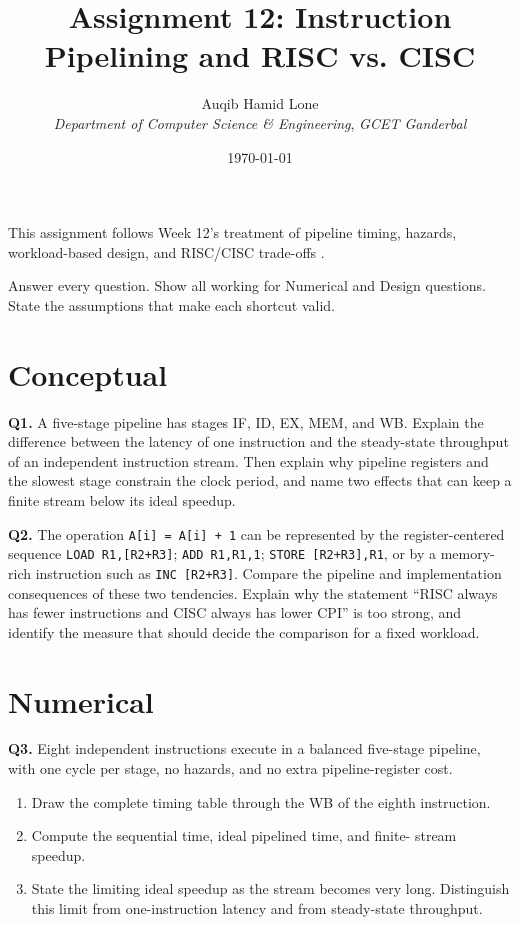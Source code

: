 \documentclass[11pt]{article}
\title{Assignment 12: Instruction Pipelining and RISC vs. CISC}
\author{Auqib Hamid Lone\\[0.3em]
  \emph{Department of Computer Science \& Engineering}, \emph{GCET Ganderbal}}
\date{\today}
\begin{document}
\maketitle

\noindent This assignment follows Week 12's treatment of pipeline timing,
hazards, workload-based design, and RISC/CISC trade-offs
\cite{Stallings2015_computer_organization,PattersonHennessy2017_computer_organization_design}.

\noindent Answer every question. Show all working for Numerical and Design
questions. State the assumptions that make each shortcut valid.

\section{Conceptual}

\textbf{Q1.} A five-stage pipeline has stages IF, ID, EX, MEM, and WB. Explain
the difference between the latency of one instruction and the steady-state
throughput of an independent instruction stream. Then explain why pipeline
registers and the slowest stage constrain the clock period, and name two
effects that can keep a finite stream below its ideal speedup.

\textbf{Q2.} The operation \texttt{A[i] = A[i] + 1} can be represented by the
register-centered sequence
\texttt{LOAD R1,[R2+R3]}; \texttt{ADD R1,R1,1};
\texttt{STORE [R2+R3],R1}, or by a memory-rich instruction such as
\texttt{INC [R2+R3]}. Compare the pipeline and implementation consequences of
these two tendencies. Explain why the statement ``RISC always has fewer
instructions and CISC always has lower CPI'' is too strong, and identify the
measure that should decide the comparison for a fixed workload.

\section{Numerical}

\textbf{Q3.} Eight independent instructions execute in a balanced five-stage
pipeline, with one cycle per stage, no hazards, and no extra
pipeline-register cost.
\begin{enumerate}
  \item[(a)] Draw the complete timing table through the WB of the eighth
        instruction.
  \item[(b)] Compute the sequential time, ideal pipelined time, and finite-
        stream speedup.
  \item[(c)] State the limiting ideal speedup as the stream becomes very long.
        Distinguish this limit from one-instruction latency and from
        steady-state throughput.
\end{enumerate}
\end{document}

